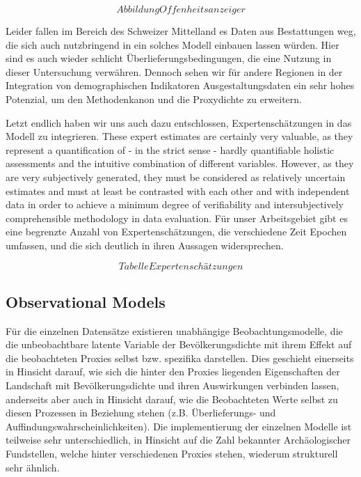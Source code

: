\documentclass[
]{article}
\begin{document}
\[Abbildung Offenheitsanzeiger\]

Leider fallen im Bereich des Schweizer Mittelland es Daten aus Bestattungen weg, die sich auch nutzbringend in ein solches Modell einbauen lassen würden. Hier sind es auch wieder schlicht Überlieferungsbedingungen, die eine Nutzung in dieser Untersuchung verwähren. Dennoch sehen wir für andere Regionen in der Integration von demographischen Indikatoren Ausgestaltungsdaten ein sehr hohes Potenzial, um den Methodenkanon und die Proxydichte zu erweitern.

Letzt endlich haben wir uns auch dazu entschlossen, Expertenschätzungen in das Modell zu integrieren. These expert estimates are certainly very valuable, as they represent a quantification of - in the strict sense - hardly quantifiable holistic assessments and the intuitive combination of different variables. However, as they are very subjectively generated, they must be considered as relatively uncertain estimates and must at least be contrasted with each other and with independent data in order to achieve a minimum degree of verifiability and intersubjectively comprehensible methodology in data evaluation. Für unser Arbeitsgebiet gibt es eine begrenzte Anzahl von Expertenschätzungen, die verschiedene Zeit Epochen umfassen, und die sich deutlich in ihren Aussagen widersprechen.

\[Tabelle Expertenschätzungen\]

\hypertarget{observational-models}{%
\subsection{Observational Models}\label{observational-models}}

Für die einzelnen Datensätze existieren unabhängige Beobachtungsmodelle, die die unbeobachtbare latente Variable der Bevölkerungsdichte mit ihrem Effekt auf die beobachteten Proxies selbst bzw. spezifika darstellen. Dies geschieht einerseits in Hinsicht darauf, wie sich die hinter den Proxies liegenden Eigenschaften der Landschaft mit Bevölkerungsdichte und ihren Auswirkungen verbinden lassen, anderseits aber auch in Hinsicht darauf, wie die Beobachteten Werte selbst zu diesen Prozessen in Beziehung stehen (z.B. Überlieferungs- und Auffindungswahrscheinlichkeiten). Die implementierung der einzelnen Modelle ist teilweise sehr unterschiedlich, in Hinsicht auf die Zahl bekannter Archäologischer Fundstellen, welche hinter verschiedenen Proxies stehen, wiederum strukturell sehr ähnlich.
\end{document}
